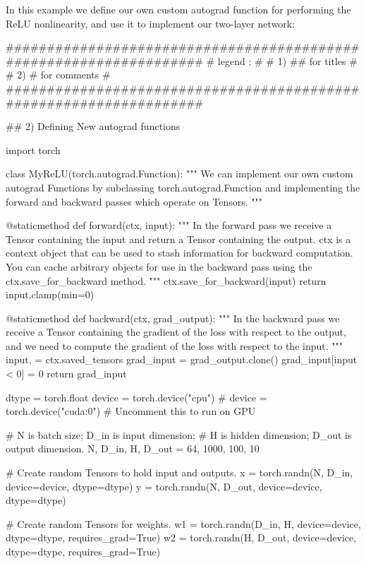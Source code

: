\documentclass[11pt]{article}
\begin{document}
In this example we define our own custom autograd function for performing the ReLU nonlinearity, and use it to implement our two-layer network:
\begin{python}
###################################################################
# legend :                                                        #
#         1) ## for titles                                        #
#         2) #  for comments                                      #
###################################################################   

## 2) Defining New autograd functions

import torch


class MyReLU(torch.autograd.Function):
    """
    We can implement our own custom autograd 
    Functions by subclassing
    torch.autograd.Function and implementing 
    the forward and backward passes
    which operate on Tensors.
    """

    @staticmethod
    def forward(ctx, input):
        """
        In the forward pass we receive a Tensor 
        containing the input and return
        a Tensor containing the output. ctx 
        is a context object that can be used
        to stash information for backward computation. 
        You can cache arbitrary
        objects for use in the backward pass using 
        the ctx.save_for_backward method.
        """
        ctx.save_for_backward(input)
        return input.clamp(min=0)

    @staticmethod
    def backward(ctx, grad_output):
        """
        In the backward pass we receive a Tensor 
        containing the gradient of the loss
        with respect to the output, and we need 
        to compute the gradient of the loss
        with respect to the input.
        """
        input, = ctx.saved_tensors
        grad_input = grad_output.clone()
        grad_input[input < 0] = 0
        return grad_input


dtype = torch.float
device = torch.device("cpu")
# device = torch.device("cuda:0") 
# Uncomment this to run on GPU

# N is batch size; D_in is input dimension;
# H is hidden dimension; D_out is output dimension.
N, D_in, H, D_out = 64, 1000, 100, 10

# Create random Tensors to hold input and outputs.
x = torch.randn(N, D_in, device=device, dtype=dtype)
y = torch.randn(N, D_out, device=device, dtype=dtype)

# Create random Tensors for weights.
w1 = torch.randn(D_in, H, device=device, dtype=dtype, 
                 requires_grad=True)
w2 = torch.randn(H, D_out, device=device, dtype=dtype, 
                 requires_grad=True)


\end{python}
\end{document}
